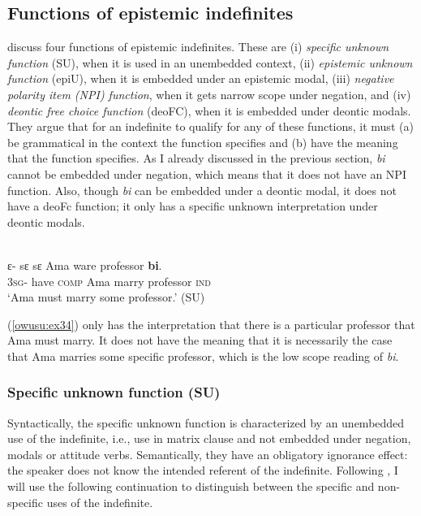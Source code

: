 \documentclass[output=paper,modfonts,nonflat,draftmode]{langsci/langscibook}
\begin{document}
\subsection{Functions of epistemic indefinites}

\citet{AloniPort2015} discuss four functions of epistemic indefinites. These are (i) \emph{specific unknown function} (SU), when it is used in an unembedded context, (ii) \emph{epistemic unknown function} (epiU), when it is embedded under an epistemic modal, (iii) \emph{negative polarity item (NPI) function}, when it gets narrow scope under negation, and (iv) \emph{deontic free choice function} (deoFC), when it is embedded under deontic modals. They argue that for an indefinite to qualify for any of these functions, it must (a) be grammatical in the context the function specifies and (b) have the meaning that the function specifies. As I already discussed in the previous section, \emph{bi} cannot be embedded under negation, which means that it does not have an NPI function. Also, though \emph{bi} can be embedded under a deontic modal, it does not have a deoFc function; it only has a specific unknown interpretation under deontic modals. 

\ea\label{owusu:ex34}\\
 \gll ε- sε  sε Ama ware professor \textbf{bi}.\\
\textsc{3sg}- have \textsc{comp} Ama marry professor \textsc{ind} \\
    
\glt `Ama must marry some professor.' (SU)

\z (\ref{owusu:ex34}) only has the interpretation that there is a particular professor that Ama must marry. It does not have the meaning that it is necessarily the case that Ama marries some specific professor, which is the low scope reading of \emph{bi}. 



\subsubsection{Specific unknown function (SU)}
Syntactically, the specific unknown function is characterized by an unembedded use of the indefinite, i.e., use in matrix clause and not embedded under negation, modals or attitude verbs. Semantically, they have an obligatory ignorance effect: the speaker does not know the intended referent of the indefinite. Following \citet{AloniPort2015}, I will use the following continuation to distinguish between the specific and non-specific uses of the indefinite.
\end{document}
